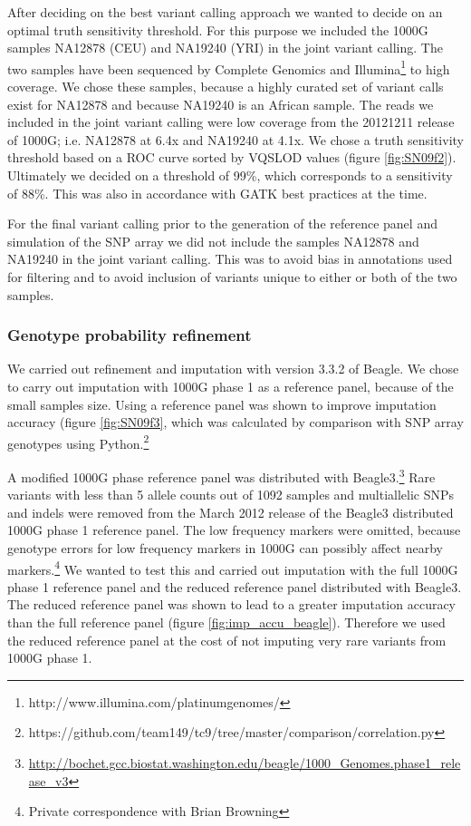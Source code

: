After deciding on the best variant calling approach we wanted to decide on an optimal truth sensitivity threshold. For this purpose we included the 1000G samples NA12878 (\gls{CEU}) and NA19240 (\gls{YRI}) in the joint variant calling. The two samples have been sequenced by Complete Genomics\cite{Drmanac01012010} and Illumina\footnote{http://www.illumina.com/platinumgenomes/} to high coverage. We chose these samples, because a highly curated set of variant calls exist for NA12878\cite{Zook2014} and because NA19240 is an African sample. The reads we included in the joint variant calling were low coverage from the 20121211 release of 1000G; i.e. NA12878 at 6.4x and NA19240 at 4.1x. We chose a truth sensitivity threshold based on a \gls{ROC} curve sorted by \gls{VQSLOD} values (figure \ref{fig:SN09f2}). Ultimately we decided on a threshold of 99\%, which corresponds to a sensitivity of 88\%. This was also in accordance with \gls{GATK} best practices at the time.


For the final variant calling prior to the generation of the reference panel and simulation of the SNP array we did not include the samples NA12878 and NA19240 in the joint variant calling. This was to avoid bias in annotations used for filtering and to avoid inclusion of variants unique to either or both of the two samples.

\subsubsection{Genotype probability refinement}
\label{subsec:AGVrefinement}
We carried out refinement and imputation with version 3.3.2 of Beagle.\cite{Browning20071084} We chose to carry out imputation with \gls{1000G} phase 1 as a reference panel, because of the small samples size. Using a reference panel was shown to improve imputation accuracy (figure \ref{fig:SN09f3}, which was calculated by comparison with SNP array genotypes using Python.\footnote{https://github.com/team149/tc9/tree/master/comparison/correlation.py}


A modified 1000G phase reference panel was distributed with Beagle3.\footnote{\url{http://bochet.gcc.biostat.washington.edu/beagle/1000_Genomes.phase1_release_v3}} Rare variants with less than 5 allele counts out of 1092 samples and multiallelic SNPs and indels were removed from the March 2012 release of the Beagle3 distributed 1000G phase 1 reference panel. The low frequency markers were omitted, because genotype errors for low frequency markers in 1000G can possibly affect nearby markers.\footnote{Private correspondence with Brian Browning} We wanted to test this and carried out imputation with the full 1000G phase 1 reference panel and the reduced reference panel distributed with Beagle3. The reduced reference panel was shown to lead to a greater imputation accuracy than the full reference panel (figure \ref{fig:imp_accu_beagle}). Therefore we used the reduced reference panel at the cost of not imputing very rare variants from 1000G phase 1.


